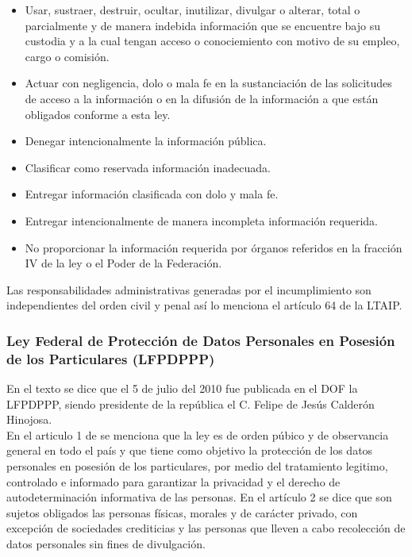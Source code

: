 \documentclass[runningheads,a4paper]{llncs}
\begin{document}
\begin{itemize}
	\item Usar, sustraer, destruir, ocultar, inutilizar, divulgar o alterar, total o parcialmente y de manera indebida información que se encuentre bajo su custodia y a la cual tengan acceso o conociemiento con motivo de su empleo, cargo o comisión.
	\item Actuar con negligencia, dolo o mala fe en la sustanciación de las solicitudes de acceso a la información o en la difusión de la información a que están obligados conforme a esta ley.
	\item Denegar intencionalmente la información pública.
	\item Clasificar como reservada información inadecuada.
	\item Entregar información clasificada con dolo y mala fe.
	\item Entregar intencionalmente de manera incompleta información requerida.
	\item No proporcionar la información requerida por órganos referidos en la fracción IV de la ley o el Poder de la Federación.
\end{itemize}

Las responsabilidades administrativas generadas por el incumplimiento son independientes del orden civil y penal así lo menciona el artículo 64 de la \gls{LTAIP}.

\subsubsection{Ley Federal de Protección de Datos Personales en Posesión de los Particulares (LFPDPPP)}
En el texto \cite{LFPDPPP_1} se dice que el 5 de julio del 2010 fue publicada en el \gls{DOF} la \gls{LFPDPPP}, siendo presidente de la república el C. Felipe de Jesús Calderón Hinojosa.\\

En el articulo 1 de \cite{LFPDPPP_1} se menciona que la ley es de orden púbico y de observancia general en todo el país y que tiene como objetivo la protección de los datos personales en posesión de los particulares, por medio del tratamiento legitimo, controlado e informado para garantizar la privacidad y el derecho de autodeterminación informativa de las personas. En el artículo 2 se dice que son sujetos obligados las personas físicas, morales y de carácter privado, con excepción de sociedades crediticias y las personas que lleven a cabo recolección de datos personales sin fines de divulgación.\\
\end{document}
